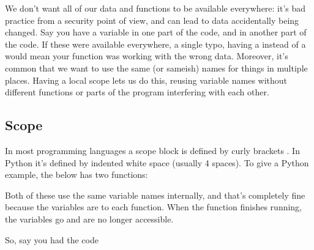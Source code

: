 \documentclass[letterpaper,10pt,british]{sphinxmanual}
\begin{document}
\sphinxAtStartPar
We don’t want all of our data and functions to be available everywhere: it’s bad practice from a security point of view, and can lead to data accidentally being changed. Say you have a variable  in one part of the code, and  in another part of the code. If these were available everywhere, a single typo, having a  instead of a  would mean your function was working with the wrong data. Moreover, it’s common that we want to use the same (or same\sphinxhyphen{}ish) names for things in multiple places. Having a local scope lets us do this, re\sphinxhyphen{}using variable names without different functions or parts of the program interfering with each other.


\subsection{Scope}
\label{\detokenize{chapters/programming_fundamentals/scope:id1}}
\sphinxAtStartPar
In most programming languages a scope block is defined by curly brackets . In Python it’s defined by indented white space (usually 4 spaces). To give a Python example, the below has two functions:

\begin{sphinxVerbatim}[commandchars=\\\{\}]
        
     

        
     
\end{sphinxVerbatim}

\sphinxAtStartPar
Both of these use the same variable names internally, and that’s completely fine because the variables are  to each function. When the function finishes running, the variables go  and are no longer accessible.

\sphinxAtStartPar
So, say you had the code

%
\begin{sphinxVerbatim}[commandchars=\\\{\},numbers=left,firstnumber=1,stepnumber=1]
  
      
\end{sphinxVerbatim}
\sphinxresetverbatimhllines
\end{document}
